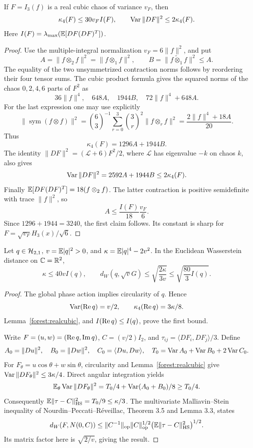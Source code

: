 \begin{lemma}
\label{forest:realcubic}
If \(F=I_3(f)\) is a real cubic chaos of variance \(v_F\), then
\[
\kappa_4(F)\le30v_F I(F),\qquad
\operatorname{Var}\|DF\|^2\le2\kappa_4(F).
\]
Here \(I(F)=\lambda_{\max}(\mathbb E[DF(DF)^T])\).
\end{lemma}
\begin{proof}
Use the multiple-integral normalization \(v_F=6\|f\|^2\), and put
\[
A=\|f\otimes_2 f\|^2=\|f\otimes_1 f\|^2,\qquad
B=\|f\widetilde\otimes_1 f\|^2\le A.
\]
The equality of the two unsymmetrized contraction norms follows by
reordering their four tensor sums. The cubic product formula gives
the squared norms of the chaos \(0,2,4,6\) parts of \(F^2\) as
\[
36\|f\|^4,\quad 648A,\quad1944B,\quad
72\|f\|^4+648A.
\]
For the last expression one may use explicitly
\[
\|\operatorname{sym}(f\otimes f)\|^2
 =\binom63^{-1}\sum_{r=0}^3\binom3r^2
       \|f\otimes_r f\|^2
 =\frac{2\|f\|^4+18A}{20}.
\]
Thus
\[
\kappa_4(F)=1296A+1944B.
\]
The identity \(\|DF\|^2=(\mathcal L+6)F^2/2\), where
\(\mathcal L\) has eigenvalue \(-k\) on chaos \(k\), also gives
\[
\operatorname{Var}\|DF\|^2=2592A+1944B\le2\kappa_4(F).
\]
Finally \(\mathbb E[DF(DF)^T]=18(f\otimes_2 f)\). The latter contraction
is positive semidefinite with trace \(\|f\|^2\), so
\[
A\le \frac{I(F)}{18}\frac{v_F}{6}.
\]
Since \(1296+1944=3240\), the first claim follows. Its constant is
sharp for \(F=\sqrt{v_F}H_3(x)/\sqrt6\).
\end{proof}

\begin{lemma}
\label{forest:clt}
Let \(q\in\mathcal H_{2,1}\), \(v=\mathbb E|q|^2>0\), and
\(\kappa=\mathbb E|q|^4-2v^2\). In the Euclidean Wasserstein distance on
\(\mathbb C=\mathbb R^2\),
\[
\kappa\le40v I(q),\qquad
d_W(q,\sqrt vG)\le\sqrt{\frac{2\kappa}{3v}}
                 \le\sqrt{\frac{80}{3}I(q)}.
\]
\end{lemma}
\begin{proof}
The global phase action implies circularity of \(q\). Hence
\[
\operatorname{Var}(\operatorname{Re} q)=v/2,\qquad
\kappa_4(\operatorname{Re} q)=3\kappa/8.
\]
Lemma~\ref{forest:realcubic}, and \(I(\operatorname{Re} q)\le I(q)\), prove the
first bound.

Write \(F=(u,w)=(\operatorname{Re} q,\operatorname{Im} q)\), \(C=(v/2)I_2\), and
\(\tau_{ij}=\langle DF_i,DF_j\rangle/3\). Define
\[
A_0=\|Du\|^2,\quad B_0=\|Dw\|^2,\quad C_0=\langle Du,Dw\rangle,
\quad
T_0=\operatorname{Var} A_0+\operatorname{Var} B_0+2\operatorname{Var} C_0.
\]
For \(F_\theta=u\cos\theta+w\sin\theta\), circularity and
Lemma~\ref{forest:realcubic} give
\(\operatorname{Var}\|DF_\theta\|^2\le3\kappa/4\). Direct angular integration yields
\[
\mathbb E_\theta\operatorname{Var}\|DF_\theta\|^2
 =T_0/4+\operatorname{Var}(A_0+B_0)/8\ge T_0/4.
\]
Consequently \(\mathbb E\|\tau-C\|_{\rm HS}^2=T_0/9\le\kappa/3\).
The multivariate Malliavin--Stein inequality of
Nourdin--Peccati--R\'eveillac, Theorem 3.5 and Lemma 3.3, states
\[
d_W(F,N(0,C))
\le \|C^{-1}\|_{\rm op}\|C\|_{\rm op}^{1/2}
       \big(\mathbb E\|\tau-C\|_{\rm HS}^2\big)^{1/2}.
\]
Its matrix factor here is \(\sqrt{2/v}\), giving the result.
\end{proof}


